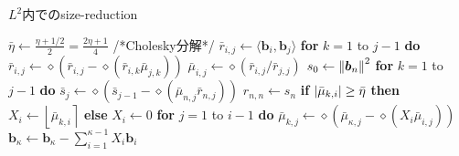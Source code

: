 \documentclass[12pt,aspectratio=169,xcolor=dvipsnames,table,dvipdfmx, leqno]{beamer}
\renewcommand{\Comment}[1]{\quad/*#1*/}
\newcommand{\round}[1]{\left\lfloor #1 \right\rceil}
\begin{document}
\begin{frame}{}
\begin{algorithm}[H]
    \footnotesize
    \begin{algorithmic}[1]
        \caption{\footnotesize $L^2$内でのsize-reduction}
        \label{alg_size_L2}
        \State $\bar{\eta}\gets\frac{\eta+1/2}{2}=\frac{2\eta+1}{4}$
        \Do
            \Comment{Cholesky分解}
                \State $\bar{r}_{i, j}\gets \langle\bm{b}_i, \bm{b}_j\rangle$
                \State \textbf{for} $k=1$ to $j-1$ \textbf{do} $\bar{r}_{i, j}\gets \diamond(\bar{r}_{i, j}-\diamond(\bar{r}_{i, k}\bar{\mu}_{j, k}))$
                \State $\bar{\mu}_{i, j}\gets \diamond(\bar{r}_{i, j}/\bar{r}_{j, j})$
            \EndFor
            \State $s_0\gets \norm{\bm{b}_n}^2$
            \State \textbf{for} $k = 1$ to $j-1$ \textbf{do} $\bar{s}_j\gets \diamond(\bar{s}_{j-1}-\diamond(\bar{\mu}_{n, j}\bar{r}_{n, j}))$
            \State $r_{n, n}\gets s_n$
                \State \textbf{if} $\abs{\bar{\mu}_{k, i}}\ge \bar{\eta}$ \textbf{then} $X_i\gets \round{\bar{\mu}_{k, i}}$ \textbf{else} $X_i\gets 0$
                \State \textbf{for} $j=1$ to $i-1$ \textbf{do} $\bar{\mu}_{k, j}\gets \diamond(\bar{\mu}_{\kappa, j}-\diamond(X_i\bar{\mu}_{i, j}))$
            \EndFor
            \State $\bm{b}_\kappa\gets \bm{b}_\kappa-\sum_{i=1}^{\kappa-1}X_i\bm{b}_i$
    \end{algorithmic}
\end{algorithm}
\end{frame}
\end{document}
